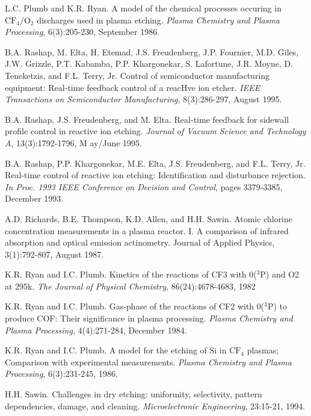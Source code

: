 \begin{thebibliography}{100}
	 L.C. Plumb and K.R. Ryan. A model of the chemical processes occuring in $\text{CF}_{4}/\text{O}_{2}$ discharges used in plasma etching. \emph{Plasma Chemistry and Plasma Processing}, 6(3):205-230, September 1986.
	
	 B.A. Rashap, M. Elta, H. Etemad, J.S. Freudenberg, J.P. Fournier, M.D. Giles, J.W. Grizzle, P.T. Kabamba, P.P. Khargonekar, S. Lafortune, J.R. Moyne, D. Teneketzis, and F.L. Terry, Jr. Control of semiconductor manufacturing equipment: Real-time feedback control of a reacHve ion etcher. \emph{IEEE Transactions on Semiconductor Manufacturing}, 8(3):286-297, August 1995.
	
	 B.A. Rashap, J.S. Freudenberg, and M. Elta. Real-time feedback for sidewall profile control in reactive ion etching. \emph{Journal of Vacuum Science and Technology A}, 13(3):1792-1796, M ay/June 1995.
	
	 B.A. Rashap, P.P. Khargonekar, M.E. Elta, J.S. Freudenberg, and F.L. Terry, Jr. Real-time control of reactive ion etching: Identification and disturbance rejection. \emph{In Proc. 1993 IEEE Conference on Decision and Control}, pages 3379-3385, December 1993.
	
	 A.D. Richards, B.E. Thompson, K.D. Allen, and H.H. Sawin. Atomic chlorine concentration measurements in a plasma reactor. I. A comparison of infrared absorption and optical emission actinometry. Journal of Applied Physics, 3(1):792-807, August 1987.
	
	 K.R. Ryan and I.C. Plumb. Kinetics of the reactions of CF3 with 0($^{3}$P) and O2 at 295k. \emph{The Journal of Physical Chemistry}, 86(24):4678-4683, 1982
	
	 K.R. Ryan and I.C. Plumb. Gas-phase of the reactions of CF2 with 0($^{3}$P) to produce COF: Their significance in plasma processing. \emph{Plasma Chemistry and Plasma Processing}, 4(4):271-284, December 1984.
	
	 K.R. Ryan and I.C. Plumb. A model for the etching of Si in $\text{CF}_{4}$ plasmas; Comparison with experimental measurements. \emph{Plasma Chemistry and Plasma Processing}, 6(3):231-245, 1986.
	
	 H.H. Sawin. Challenges in dry etching: uniformity, selectivity, pattern dependencies, damage, and cleaning. \emph{Microelectronic Engineering}, 23:15-21, 1994.
	

\end{thebibliography}
